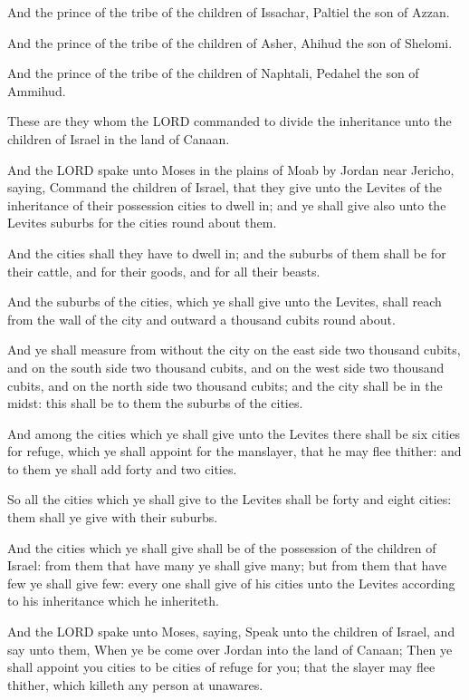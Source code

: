 \Verse And the prince of the tribe of the children of Issachar, Paltiel
the son of Azzan.

\Verse And the prince of the tribe of the children of Asher, Ahihud the
son of Shelomi.

\Verse And the prince of the tribe of the children of Naphtali, Pedahel
the son of Ammihud.

\Verse These are they whom the LORD commanded to divide the inheritance
unto the children of Israel in the land of Canaan.


\Chapter
\Verse And the LORD spake unto Moses in the plains of Moab by Jordan
near Jericho, saying, \Verse Command the children of Israel, that they
give unto the Levites of the inheritance of their possession cities to
dwell in; and ye shall give also unto the Levites suburbs for the
cities round about them.

\Verse And the cities shall they have to dwell in; and the suburbs of
them shall be for their cattle, and for their goods, and for all their
beasts.

\Verse And the suburbs of the cities, which ye shall give unto the
Levites, shall reach from the wall of the city and outward a thousand
cubits round about.

\Verse And ye shall measure from without the city on the east side two
thousand cubits, and on the south side two thousand cubits, and on the
west side two thousand cubits, and on the north side two thousand
cubits; and the city shall be in the midst: this shall be to them the
suburbs of the cities.

\Verse And among the cities which ye shall give unto the Levites there
shall be six cities for refuge, which ye shall appoint for the
manslayer, that he may flee thither: and to them ye shall add forty
and two cities.

\Verse So all the cities which ye shall give to the Levites shall be
forty and eight cities: them shall ye give with their suburbs.

\Verse And the cities which ye shall give shall be of the possession of
the children of Israel: from them that have many ye shall give many;
but from them that have few ye shall give few: every one shall give of
his cities unto the Levites according to his inheritance which he
inheriteth.

\Verse And the LORD spake unto Moses, saying, \Verse Speak unto the
children of Israel, and say unto them, When ye be come over Jordan
into the land of Canaan; \Verse Then ye shall appoint you cities to be
cities of refuge for you; that the slayer may flee thither, which
killeth any person at unawares.

